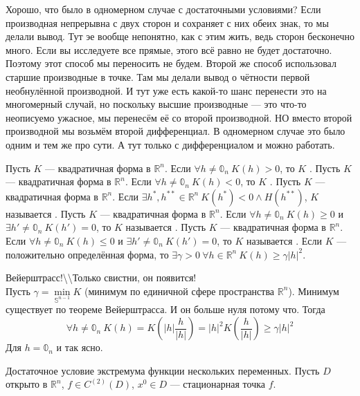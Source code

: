 \documentclass{article}
\begin{document}
\begin{itemize}
\begin{Comment}
            Хорошо, что было в одномерном случае с достаточными условиями? Если производная непрерывна с двух сторон и сохраняет с них обеих знак, то мы делали вывод. Тут эе вообще непонятно, как с этим жить, ведь сторон бесконечно много. Если вы исследуете все прямые, этого всё равно не будет достаточно. Поэтому этот способ мы переносить не будем. Второй же способ использовал старшие производные в точке. Там мы делали вывод о чётности первой необнулённой производной. И тут уже есть какой-то шанс перенести это на многомерный случай, но поскольку высшие производные --- это что-то неописуемо ужасное, мы перенесём её со второй производной. НО вместо второй производной мы возьмём второй дифференциал. В одномерном случае это было одним и тем же про сути. А тут только с дифференциалом и можно работать.
        \end{Comment}
        \dfn Пусть $K$ --- квадратичная форма в $\mathbb R^n$. Если $\forall h\neq\mathbb0_n~K(h)>0$, то $K$ .
        \dfn Пусть $K$ --- квадратичная форма в $\mathbb R^n$. Если $\forall h\neq\mathbb0_n~K(h)<0$, то $K$ .
        \dfn Пусть $K$ --- квадратичная форма в $\mathbb R^n$. Если $\exists h^*,h^{**}\in\mathbb R^n~K(h^*)<0\land H(h^{**})$, $K$ называется .
        \dfn Пусть $K$ --- квадратичная форма в $\mathbb R^n$. Если $\forall h\neq\mathbb0_n~K(h)\geqslant0$ и $\exists h'\neq\mathbb0_n~K(h')=0$, то $K$ называется .
        \dfn Пусть $K$ --- квадратичная форма в $\mathbb R^n$. Если $\forall h\neq\mathbb0_n~K(h)\leqslant0$ и $\exists h'\neq\mathbb0_n~K(h')=0$, то $K$ называется .
        \thm Если $K$ --- положительно определённая форма, то $\exists\gamma>0~\forall h\in\mathbb R^n~K(h)\geqslant\gamma|h|^2$.
        \begin{Proof}
            Вейерштрасс!\textbackslash\textbackslash Только свистни, он появится!\\
            Пусть $\gamma=\min\limits_{\mathbb S^{n-1}}K$ (минимум по единичной сфере пространства $\mathbb R^n$). Минимум существует по теореме Вейерштрасса. И он больше нуля потому что. Тогда
            \[
            \forall h\neq\mathbb0_n~K(h)=K(|h|\frac h{|h|})=|h|^2K(\frac h{|h|})\geqslant\gamma|h|^2
            \]
            Для $h=\mathbb0_n$ и так ясно.
        \end{Proof}
        \thm Достаточное условие экстремума функции нескольких переменных. Пусть $D$ открыто в $\mathbb R^n$, $f\in C^{(2)}(D)$, $x^0\in D$ --- стационарная точка $f$.

\end{itemize}
\end{document}
